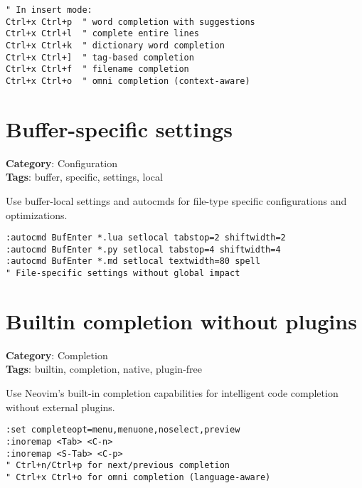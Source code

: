 {{{\begin{Exa*}{}
\begin{Verbatim}[fontsize=\footnotesize, breaklines, breakanywhere]
" In insert mode:
Ctrl+x Ctrl+p  " word completion with suggestions
Ctrl+x Ctrl+l  " complete entire lines
Ctrl+x Ctrl+k  " dictionary word completion  
Ctrl+x Ctrl+]  " tag-based completion
Ctrl+x Ctrl+f  " filename completion
Ctrl+x Ctrl+o  " omni completion (context-aware)
\end{Verbatim}
\end{Exa*}

\section{Buffer-specific settings}

\textbf{Category}: Configuration\\ \textbf{Tags}: buffer, specific, settings, local
\vspace{0.5cm}

Use buffer-local settings and autocmds for file-type specific configurations and optimizations.

\begin{Exa*}{}
\begin{Verbatim}[fontsize=\footnotesize, breaklines, breakanywhere]
:autocmd BufEnter *.lua setlocal tabstop=2 shiftwidth=2
:autocmd BufEnter *.py setlocal tabstop=4 shiftwidth=4
:autocmd BufEnter *.md setlocal textwidth=80 spell
" File-specific settings without global impact
\end{Verbatim}
\end{Exa*}

\section{Builtin completion without plugins}

\textbf{Category}: Completion\\ \textbf{Tags}: builtin, completion, native, plugin-free
\vspace{0.5cm}

Use Neovim's built-in completion capabilities for intelligent code completion without external plugins.

\begin{Exa*}{}
\begin{Verbatim}[fontsize=\footnotesize, breaklines, breakanywhere]
:set completeopt=menu,menuone,noselect,preview
:inoremap <Tab> <C-n>
:inoremap <S-Tab> <C-p>
" Ctrl+n/Ctrl+p for next/previous completion
" Ctrl+x Ctrl+o for omni completion (language-aware)
\end{Verbatim}
\end{Exa*}

}}}
